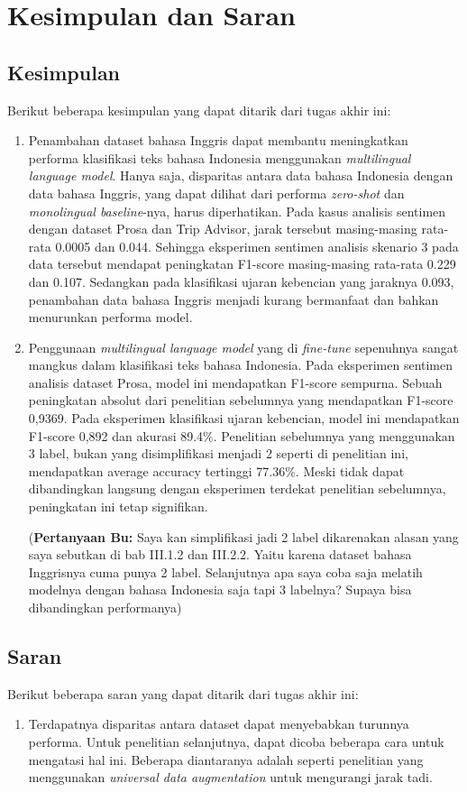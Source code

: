 \chapter{Kesimpulan dan Saran}

\section{Kesimpulan}
Berikut beberapa kesimpulan yang dapat ditarik dari tugas akhir ini:
\begin{enumerate}
    \item Penambahan dataset bahasa Inggris dapat membantu meningkatkan performa klasifikasi teks bahasa Indonesia menggunakan \textit{multilingual language model}. Hanya saja, disparitas antara data bahasa Indonesia dengan data bahasa Inggris, yang dapat dilihat dari performa \textit{zero-shot} dan \textit{monolingual baseline}-nya, harus diperhatikan. Pada kasus analisis sentimen dengan dataset Prosa dan Trip Advisor, jarak tersebut masing-masing rata-rata 0.0005 dan 0.044. Sehingga eksperimen sentimen analisis skenario 3 pada data tersebut mendapat peningkatan F1-score masing-masing rata-rata 0.229 dan 0.107. Sedangkan pada klasifikasi ujaran kebencian yang jaraknya 0.093, penambahan data bahasa Inggris menjadi kurang bermanfaat dan bahkan menurunkan performa model.
    \item Penggunaan \textit{multilingual language model} yang di \textit{fine-tune} sepenuhnya sangat mangkus dalam klasifikasi teks bahasa Indonesia. Pada eksperimen sentimen analisis dataset Prosa, model ini mendapatkan F1-score sempurna. Sebuah peningkatan absolut dari penelitian sebelumnya yang mendapatkan F1-score 0,9369. Pada eksperimen klasifikasi ujaran kebencian, model ini mendapatkan F1-score 0,892 dan akurasi 89.4\%. Penelitian sebelumnya yang menggunakan 3 label, bukan yang disimplifikasi menjadi 2 seperti di penelitian ini, mendapatkan average accuracy tertinggi 77.36\%. Meski tidak dapat dibandingkan langsung dengan eksperimen terdekat penelitian sebelumnya, peningkatan ini tetap signifikan. 
    
    (\textbf{Pertanyaan Bu:} Saya kan simplifikasi jadi 2 label dikarenakan alasan yang saya sebutkan di bab III.1.2 dan III.2.2. Yaitu karena dataset bahasa Inggrisnya cuma punya 2 label. Selanjutnya apa saya coba saja melatih modelnya dengan bahasa Indonesia saja tapi 3 labelnya? Supaya bisa dibandingkan performanya)

\end{enumerate}

\section{Saran}
Berikut beberapa saran yang dapat ditarik dari tugas akhir ini:
\begin{enumerate}
    \item Terdapatnya disparitas antara dataset dapat menyebabkan turunnya performa. Untuk penelitian selanjutnya, dapat dicoba beberapa cara untuk mengatasi hal ini. Beberapa diantaranya adalah seperti penelitian \parencite{Lai_Oguz_Yang_Stoyanov_2019} yang menggunakan \textit{universal data augmentation} untuk mengurangi jarak tadi.
\end{enumerate}